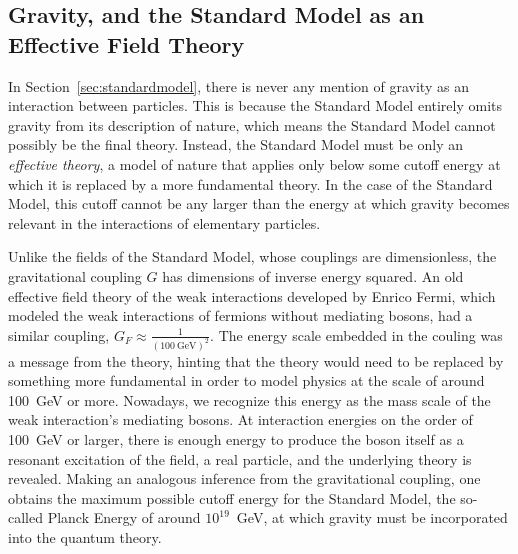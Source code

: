   \subsection{Gravity, and the Standard Model as an Effective Field Theory} \label{sec:gravity}

  In Section~\ref{sec:standardmodel}, there is never any mention of gravity as an interaction between particles.
  This is because the Standard Model entirely omits gravity from its description of nature, which means the Standard Model cannot possibly be the final theory.
  Instead, the Standard Model must be only an {\it effective theory}, a model of nature that applies only below some cutoff energy at which it is replaced by a more fundamental theory.
  In the case of the Standard Model, this cutoff cannot be any larger than the energy at which gravity becomes relevant in the interactions of elementary particles.

  Unlike the fields of the Standard Model, whose couplings are dimensionless, the gravitational coupling $G$ has dimensions of inverse energy squared.
  An old effective field theory of the weak interactions developed by Enrico Fermi, which modeled the weak interactions of fermions without mediating bosons, had a similar coupling, $G_F \approx \frac{1}{(100\mathrm{~GeV})^2}$.
  The energy scale embedded in the couling was a message from the theory, hinting that the theory would need to be replaced by something more fundamental in order to model physics at the scale of around 100~GeV or more.
  Nowadays, we recognize this energy as the mass scale of the weak interaction's mediating bosons.
  At interaction energies on the order of 100~GeV or larger, there is enough energy to produce the boson itself as a resonant excitation of the field, a real particle, and the underlying theory is revealed.
  Making an analogous inference from the gravitational coupling, one obtains the maximum possible cutoff energy for the Standard Model, the so-called Planck Energy of around $10^{19}$~GeV, at which gravity must be incorporated into the quantum theory.

